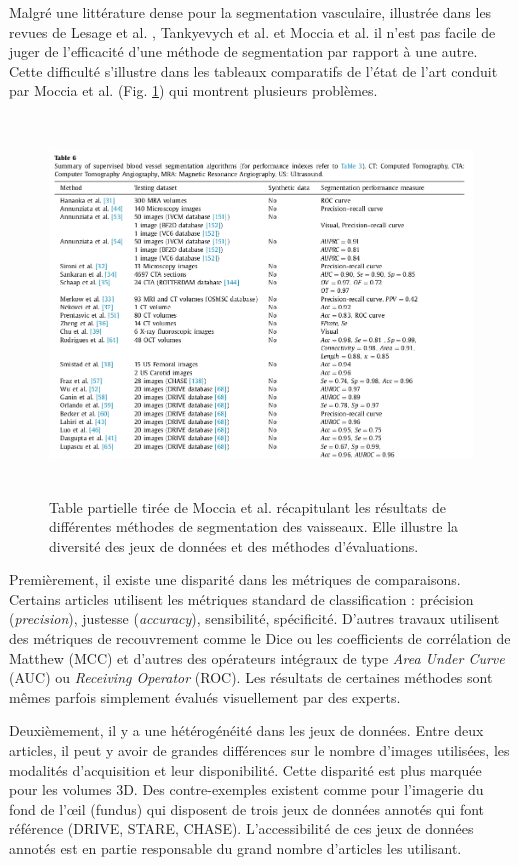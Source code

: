     Malgré une littérature dense pour la segmentation vasculaire, illustrée dans les revues de Lesage et al. \cite{Lesage2009_review}, Tankyevych et al. \cite{Tankyevych2011_angiographic} et Moccia et al. \cite{Moccia2018_survey} il n'est pas facile de juger de l'efficacité d'une méthode de segmentation par rapport à une autre. Cette difficulté s'illustre dans les tableaux comparatifs de l'état de l'art conduit par  Moccia et al. (Fig. \ref{fig:moccia_table}) qui montrent plusieurs problèmes.
    \begin{figure}[!ht]
      \centering
      \includegraphics[height=10cm]{Images/Moccia_example.png}
      \caption{Table partielle tirée de Moccia et al. \cite{Moccia2018_survey} récapitulant les résultats de différentes méthodes de segmentation des vaisseaux. Elle illustre la diversité des jeux de données et des méthodes d'évaluations.}
      \label{fig:moccia_table}
    \end{figure}
    Premièrement, il existe une disparité dans les métriques de comparaisons. Certains articles utilisent les métriques standard de classification : précision (\textit{precision}), justesse (\textit{accuracy}), sensibilité, spécificité. D'autres travaux utilisent des métriques de recouvrement comme le Dice ou les coefficients de corrélation de Matthew (MCC) et d'autres des opérateurs intégraux de type \textit{Area Under Curve} (AUC) ou \textit{Receiving Operator} (ROC). Les résultats de certaines méthodes sont mêmes parfois simplement évalués visuellement par des experts.

    Deuxièmement, il y a une hétérogénéité dans les jeux de données. Entre deux articles, il peut y avoir de grandes différences sur le nombre d'images utilisées, les modalités d'acquisition et leur disponibilité. Cette disparité est plus marquée pour les volumes 3D. Des contre-exemples existent comme pour l'imagerie du fond de l'œil (fundus) qui disposent de trois jeux de données annotés qui font référence (DRIVE, STARE, CHASE). L'accessibilité de ces jeux de données annotés est en partie responsable du grand nombre d'articles les utilisant.

